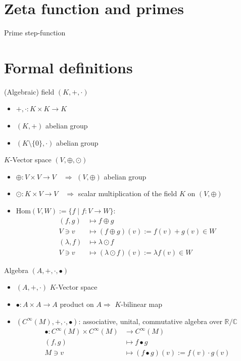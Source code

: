 \documentclass[10pt, dvipsnames]{beamer}
\begin{document}
	\section{Zeta function and primes}
	\begin{frame}{Prime step-function}
	\end{frame}
	
	\section{Formal definitions}
	\begin{frame}{(Algebraic) field $(K, +, \cdot)$}
		\begin{itemize}[label={--}, itemsep=10pt]
			\item $+, \cdot: K \times K \to K$ 
			\item $(K, +)$ abelian group 
			\item $(K \setminus \{ 0\}, \cdot)$ abelian group 
		\end{itemize} 
	\end{frame}

	\begin{frame}{$K$-Vector space $(V, \oplus, \odot)$}
		\begin{itemize}[label={--}, itemsep=10pt]
			\item $\oplus: V \times V \to V \quad \Rightarrow $  $(V, \oplus)$ abelian group 
			\item $\odot : K \times V \to V \quad \Rightarrow$ scalar multiplication of the field $K$ on $(V, \oplus)$ 
			\item $\text{Hom} (V, W) := \{f \mid f: V \to W \} $: 
			\begin{align*}
				(f, g) &\mapsto f \oplus g \\
				V \ni v &\mapsto (f \oplus g) (v) := f(v) + g(v) \in W \\ 
				(\lambda, f) &\mapsto \lambda \odot f \\ 
				V \ni v &\mapsto (\lambda \odot f) (v):= \lambda f(v) \in W 
			\end{align*}
		\end{itemize} 
	\end{frame}

	\begin{frame}{Algebra $(A, +, \cdot, \bullet)$}
		\begin{itemize}[label={--}, itemsep=10pt] 
			\item $(A, +, \cdot)$ $K$-Vector space 
			\item $\bullet: A \times A \to A$ product on $A \Rightarrow$ $K$-bilinear map 
			\item $(C^\infty(M), +, \cdot, \bullet)$: associative, unital, commutative algebra over $\mathbb{R}/ \mathbb{C}$ 
			\begin{align*}
				\bullet: C^\infty (M) \times C^\infty (M) &\to C^\infty (M) \\
				(f, g) &\mapsto f \bullet g \\ 
				M \ni v &\mapsto (f\bullet g) (v) := f(v) \cdot g(v) 
			\end{align*}
		\end{itemize} 
	\end{frame}

	\maketitle
\end{document}
